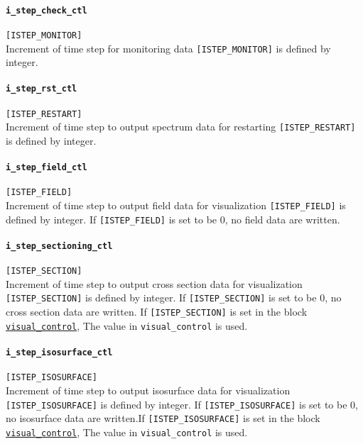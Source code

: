 \paragraph{\tt i\_step\_check\_ctl}
\label{href_t:i_step_check_ctl}
\verb|[ISTEP_MONITOR]| \\
Increment of time step for monitoring data \verb|[ISTEP_MONITOR]| is defined by integer.

\paragraph{\tt i\_step\_rst\_ctl}
\label{href_t:i_step_rst_ctl}
\verb|[ISTEP_RESTART]| \\
Increment of time step to output spectrum data for restarting \verb|[ISTEP_RESTART]| is defined by integer.

\paragraph{\tt i\_step\_field\_ctl}
\label{href_t:i_step_field_ctl}
\verb|[ISTEP_FIELD]| \\
Increment of time step to output field data for visualization \verb|[ISTEP_FIELD]| is defined by integer. If \verb|[ISTEP_FIELD]| is set to be 0, no field data are written.

\paragraph{\tt i\_step\_sectioning\_ctl}
\label{href_t:i_step_sectioning_ctl}
\verb|[ISTEP_SECTION]| \\
Increment of time step to output cross section data for visualization \verb|[ISTEP_SECTION]| is defined by integer. If \verb|[ISTEP_SECTION]| is set to be 0, no cross section data are written. If \verb|[ISTEP_SECTION]| is set in the block \hyperref[href_i:visual_control]{\tt visual\_control}, The value in {\tt visual\_control} is used.

\paragraph{\tt i\_step\_isosurface\_ctl}
\label{href_t:i_step_isosurface_ctl}
\verb|[ISTEP_ISOSURFACE]| \\
Increment of time step to output isosurface data for visualization \verb|[ISTEP_ISOSURFACE]| is defined by integer. If \verb|[ISTEP_ISOSURFACE]| is set to be 0, no isosurface data are written.If \verb|[ISTEP_ISOSURFACE]| is set in the block \hyperref[href_i:visual_control]{\tt visual\_control}, The value in {\tt visual\_control} is used.

